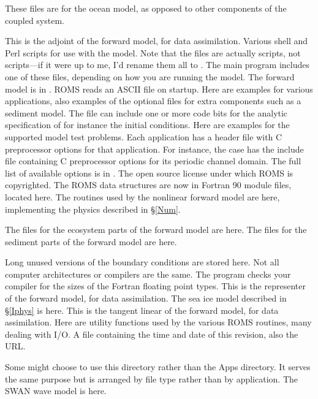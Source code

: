 \begin{klist}
  These files are for the ocean model, as opposed to other components of
  the coupled system.
\begin{klist}
   This is the adjoint of the forward model, for data
  assimilation.
   Various shell and Perl scripts for use with the model.
  Note that the  files are actually  scripts, not
   scripts---if it were up to me, I'd rename them all to .
   The main program includes one of these files,
  depending on how you are running the model. The forward model is in
  .
   ROMS reads an ASCII file on startup. Here are
  examples for various applications, also examples of the optional
  files for extra components such as a sediment model.
   The file  can include one
  or more code bits for the analytic specification of for instance the
  initial conditions. Here are examples for the supported model test
  problems.
   Each application has a header file with C
  preprocessor options for that application. For instance, the
   case has the include file 
  containing C preprocessor options for its periodic channel domain.
  The full list of available options is in .
   The open source license under which ROMS
  is copyrighted.
   The ROMS data structures are now in Fortran 90
  module files, located here.
   The routines used by the nonlinear forward model
  are here, implementing the physics described in \S\ref{Num}.
  \begin{klist}
     The files for the ecosystem parts of the forward
    model are here.
     The files for the sediment parts of the forward
    model are here.
  \end{klist}
   Long unused versions of the boundary conditions
  are stored here.
   Not all computer architectures or compilers are the same.
  The  program checks your compiler for the sizes of the
  Fortran floating point types.
   This is the representer of the forward model, for
  data assimilation.
   The sea ice model described in \S\ref{Iphys} is here.
   This is the tangent linear of the forward model, for data
  assimilation.
   Here are utility functions used by the various
  ROMS routines, many dealing with I/O.
   A file containing the time and date of this
   revision, also the  URL.
\end{klist}
   Some might choose to use this directory rather than
  the Apps directory. It serves the same purpose but is arranged
  by file type rather than by application.
   The SWAN wave model is here.
\end{klist}

